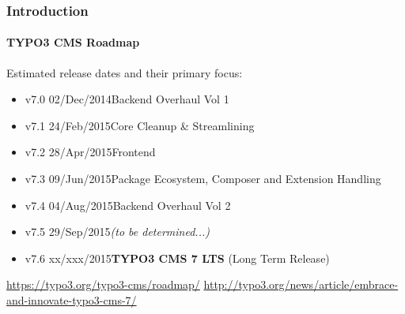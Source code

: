 \begin{frame}[fragile]
	\frametitle{Introduction}
	\framesubtitle{TYPO3 CMS Roadmap}

	Estimated release dates and their primary focus:

	\begin{itemize}
		\item v7.0 \tabto{1.0cm}02/Dec/2014\tabto{3.4cm}Backend Overhaul Vol 1
		\item v7.1 \tabto{1.0cm}24/Feb/2015\tabto{3.4cm}Core Cleanup \& Streamlining

		\item
			\begingroup
				\color{typo3orange}
					v7.2 \tabto{1.0cm}28/Apr/2015\tabto{3.4cm}Frontend
			\endgroup

		\item v7.3 \tabto{1.0cm}09/Jun/2015\tabto{3.4cm}Package Ecosystem, Composer\newline
			\tabto{3.4cm}and Extension Handling
		\item v7.4 \tabto{1.0cm}04/Aug/2015\tabto{3.4cm}Backend Overhaul Vol 2
		\item v7.5 \tabto{1.0cm}29/Sep/2015\tabto{3.4cm}\textit{(to be determined...)}
		\item v7.6 \tabto{1.0cm}xx/xxx/2015\tabto{3.4cm}\textbf{TYPO3 CMS 7 LTS} (Long Term Release)
	\end{itemize}

	\smaller
		\url{https://typo3.org/typo3-cms/roadmap/}\newline
		\url{http://typo3.org/news/article/embrace-and-innovate-typo3-cms-7/}
	\normalsize

\end{frame}

